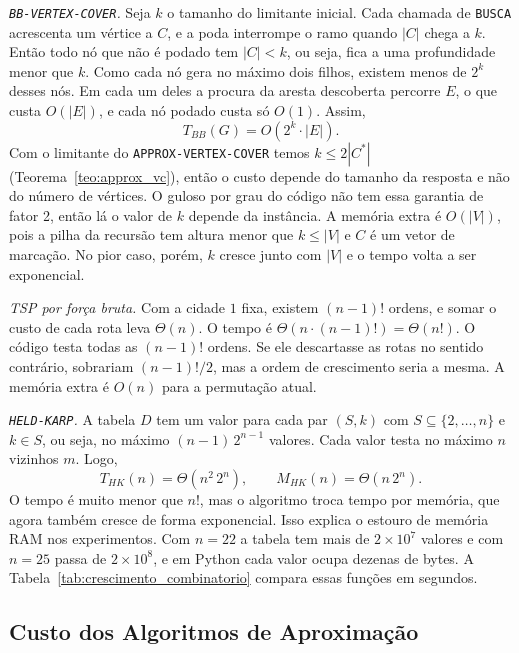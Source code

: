 \documentclass[conference]{IEEEtran}
\theoremstyle{definition}
\theoremstyle{plain}
\begin{document}
\textit{\texttt{BB-VERTEX-COVER}.} Seja $k$ o tamanho do limitante inicial. Cada chamada de \texttt{BUSCA} acrescenta um vértice a $C$, e a poda interrompe o ramo quando $|C|$ chega a $k$. Então todo nó que não é podado tem $|C| < k$, ou seja, fica a uma profundidade menor que $k$. Como cada nó gera no máximo dois filhos, existem menos de $2^{k}$ desses nós. Em cada um deles a procura da aresta descoberta percorre $E$, o que custa $O(|E|)$, e cada nó podado custa só $O(1)$. Assim,
\begin{equation}
T_{BB}(G) = O(2^{k} \cdot |E|).
\end{equation}
Com o limitante do \texttt{APPROX-VERTEX-COVER} temos $k \le 2|C^*|$ (Teorema~\ref{teo:approx_vc}), então o custo depende do tamanho da resposta e não do número de vértices. O guloso por grau do código não tem essa garantia de fator 2, então lá o valor de $k$ depende da instância. A memória extra é $O(|V|)$, pois a pilha da recursão tem altura menor que $k \le |V|$ e $C$ é um vetor de marcação. No pior caso, porém, $k$ cresce junto com $|V|$ e o tempo volta a ser exponencial.

\textit{TSP por força bruta.} Com a cidade $1$ fixa, existem $(n-1)!$ ordens, e somar o custo de cada rota leva $\Theta(n)$. O tempo é $\Theta(n \cdot (n-1)!) = \Theta(n!)$. O código testa todas as $(n-1)!$ ordens. Se ele descartasse as rotas no sentido contrário, sobrariam $(n-1)!/2$, mas a ordem de crescimento seria a mesma. A memória extra é $O(n)$ para a permutação atual.

\textit{\texttt{HELD-KARP}.} A tabela $D$ tem um valor para cada par $(S, k)$ com $S \subseteq \{2,\dots,n\}$ e $k \in S$, ou seja, no máximo $(n-1)\,2^{n-1}$ valores. Cada valor testa no máximo $n$ vizinhos $m$. Logo,
\begin{equation}
T_{HK}(n) = \Theta(n^2\, 2^n), \qquad M_{HK}(n) = \Theta(n\, 2^n).
\end{equation}
O tempo é muito menor que $n!$, mas o algoritmo troca tempo por memória, que agora também cresce de forma exponencial. Isso explica o estouro de memória RAM nos experimentos. Com $n = 22$ a tabela tem mais de $2 \times 10^7$ valores e com $n = 25$ passa de $2 \times 10^8$, e em Python cada valor ocupa dezenas de bytes. A Tabela~\ref{tab:crescimento_combinatorio} compara essas funções em segundos.

\subsection{Custo dos Algoritmos de Aproximação}
\end{document}
